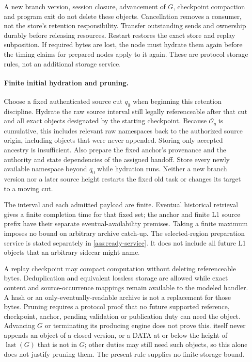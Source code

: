 \documentclass[11pt,a4paper]{article}
\newcounter{protocol}
\begin{document}
A new branch version, session closure, advancement of $G$, checkpoint
compaction and program exit do not delete these objects. Cancellation
removes a consumer, not the store's retention responsibility. Transfer
outstanding sends and ownership durably before releasing resources.
Restart restores the exact store and replay subposition. If required
bytes are lost, the node must hydrate them again before the timing
claims for prepared nodes apply to it again.
These are protocol storage rules, not an additional storage service.

\paragraph{Finite initial hydration and pruning.}
\label{sec:source-hydration}
Choose a fixed authenticated source cut $q_0$ when beginning this
retention discipline. Hydrate the raw source interval still legally
referenceable after that cut and all exact objects designated by the
starting checkpoint. Because $\mathcal O_q$ is cumulative, this
includes relevant raw namespaces back to the authorized source origin,
including objects that were never appended. Storing only accepted
ancestry is insufficient. Also prepare the fixed anchor's provenance and the
authority and state dependencies of the assigned handoff.
Store every newly available namespace beyond $q_0$ while hydration
runs. Neither a new branch version nor a later source height restarts the fixed
old task or changes its target to a moving cut.

The interval and each admitted payload are finite. Eventual historical
retrieval gives a finite completion time for that fixed set; the anchor
and finite L1 source prefix have their separate eventual-availability
premises. Taking a finite maximum imposes no bound on arbitrary archive catch-up.
The selected-region preparation service is stated separately in
\cref{ass:ready-service}. It does not include all future
L1 objects that an arbitrary sidecar might name.

A replay checkpoint may compact computation without deleting
referenceable bytes. Deduplication and equivalent lossless storage are
allowed while exact content and source-occurrence mappings remain
available to the modeled handler. A hash or an only-eventually-readable
archive is not a replacement for those bytes. Pruning requires a
protocol proof that no future supported reference, checkpoint,
anchor, pending validation or publication duty can need the object.
Advancing $G$ or terminating its producing engine does not prove this.
 itself never appends an object of a closed
version, or a DATA at or below the height of $\operatorname{last}(G)$
that is not in $G$; other duties may still need such objects, so this
alone does not justify pruning them.
The present rule supplies no finite-storage bound.
\end{document}

